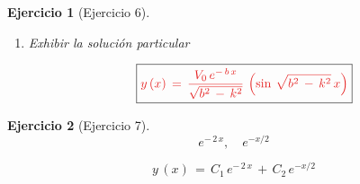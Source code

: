 \documentclass[a4paper,11pt, openany]{book}
\newtheorem{ejer}{Ejercicio}[section]
\newcommand*{\itembolasazules}[1]{%
\footnotesize\protect\tikz[baseline=-3pt]%
\protect\node[scale=.7, circle, shade, ball
color=green]{\color{white}\Large\bf#1};}
\begin{document}
\begin{ejer}[Ejercicio 6]
\begin{enumerate}[label=\itembolasazules{\arabic*}]
$$y\,(\textcolor{lust}{0})\,=\,e^{-\,b\,(\textcolor{lust}{0})}\,\left(C_{1}\,\cos\,\sqrt{b^{2}\,-\,k^{2}}\,(\textcolor{lust}{0})\,+\,C_{2}\,\sin\,\sqrt{b^{2}\,-\,k^{2}}\,(\textcolor{lust}{0}) \right)$$
 
$$C_{1}\,\cos\,0\,+\,C_{2}\,\sin\,0\,=\,0 \quad \textcolor{lust}{\iff} \quad \boxed{C_{1}\,=\,0}$$
 
\begin{multline*}
y'\,(\textcolor{lust}{0})\,=\,-\,b\,e^{-\,b\,(\textcolor{lust}{0})}\,\left(\cancel{C_{1}\,\cos\,\sqrt{b^{2}\,-\,k^{2}}\,(\textcolor{lust}{0})}\,+\,C_{2}\,\sin\,\sqrt{b^{2}\,-\,k^{2}}\,(\textcolor{lust}{0}) \right)\,\textcolor{lust}{+} \\
e^{-\,b\,(\textcolor{lust}{0})}\,\left[\cancel{C_{1}\,\left(-\,\sin\,\sqrt{b^{2}\,-\,k^{2}}\,x \right)\,\textcolor{lust}{\times}\,\sqrt{b^{2}\,-\,k^{2}}}\,+\,C_{2}\,\left(\cos\,\sqrt{b^{2}\,-\,k^{2}}\,(\textcolor{lust}{0}) \right)\,\textcolor{lust}{\times}\,\sqrt{b^{2}\,-\,k^{2}}  \right]    
\end{multline*}
 
$$-\,b\,\left(\sin\,0 \right)\,+\,C_{2}\,\sqrt{b^{2}\,-\,k^{2}}\,\cos\,0\,=\,V_{0} \quad \textcolor{lust}{\iff} \quad C_{2}\,\sqrt{b^{2}\,-\,k^{2}}\,=\,V_{0}$$
 
$$\boxed{C_{2}\,=\,\dfrac{V_{0}}{\sqrt{b^{2}\,-\,k^{2} }}}$$
 
\item Exhibir la solución particular
 
$$\boxed{\textcolor{lust}{y\,(x)\,=\,\dfrac{V_{0}\,e^{-\,b\,x}}{\sqrt{b^{2}\,-\,k^{2} }}\,\left(\sin\,\sqrt{b^{2}\,-\,k^{2}}\,x \right)}}$$
 
\end{enumerate}

\end{ejer}
 
\begin{ejer}[Ejercicio 7]
 
$$e^{-\,2\,x}, \quad e^{-x/2}$$

$$\boxed{y\,(x)\,=\,C_{1}\,e^{-\,2\,x}\,+\,C_{2}\,e^{-x/2}}$$

\end{ejer}
 
\end{document}
